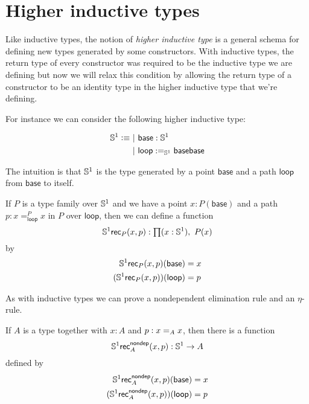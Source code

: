 \newcommand{\base}{\ensuremath{\mathsf{base}}\xspace}
\newcommand{\lloop}{\ensuremath{\mathsf{loop}}\xspace}
\newcommand{\seg}{\ensuremath{\mathsf{seg}}\xspace}
\newcommand{\eqtopath}{\ensuremath{\mathsf{eqtopath}}\xspace}

\chapter{Higher inductive types}
\label{cha:hits}

Like inductive types, the notion of \emph{higher inductive type} is a general
schema for defining new types generated by some constructors. With inductive
types, the return type of every constructor was required to be the inductive
type we are defining but now we will relax this condition by allowing the return
type of a constructor to be an identity type in the higher inductive type that
we’re defining.

For instance we can consider the following higher inductive type:

\begin{align*}
  \Sn^1 \defeq&\ |\ \base:\Sn^1 \\
  &\ |\ \lloop:\id[\Sn^1]\base\base
\end{align*}

The intuition is that $\Sn^1$ is the type generated by a point \base and a path
\lloop from \base to itself.

If $P$ is a type family over $\Sn^1$ and we have a point $x:P(\base)$ and a
path $p:x=^P_\lloop{}x$ in $P$ over $\lloop$, then we can define a function
\[\Sn^1\mathsf{rec}_P(x,p):\prd{x:\Sn^1}P(x)\]
by
\begin{align*}
  \Sn^1\mathsf{rec}_P(x,p)(\base)&=x \\
  \map{(\Sn^1\mathsf{rec}_P(x,p))}{\lloop}&=p
\end{align*}

As with inductive types we can prove a nondependent elimination rule and an
$\eta$-rule.

\begin{lem}
  If $A$ is a type together with $x:A$ and $p:\id[A]xx$, then there is a
  function
  \[\Sn^1\mathsf{rec}^{\mathsf{nondep}}_A(x,p):\Sn^1\to{}A\]
  defined by
  \begin{align*}
    \Sn^1\mathsf{rec}^{\mathsf{nondep}}_A(x,p)(\base)&=x \\
    \map{(\Sn^1\mathsf{rec}^{\mathsf{nondep}}_A(x,p))}{\lloop}&=p
  \end{align*}
\end{lem}

